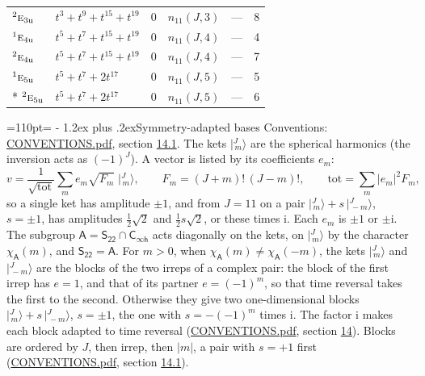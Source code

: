 \documentclass[10pt,a4paper]{article}
\makeatletter
\renewcommand\section{\@startsection{section}{1}{\z@}{-3ex plus -1ex minus -.2ex}%
  {1.2ex plus .2ex}{\normalfont\large\sffamily\bfseries\color{parttitle}}}
\newcommand{\needspace}[1]{\par\penalty-100\begingroup\dimen0=#1\relax\dimen2=\pagegoal
  \advance\dimen2-\pagetotal\ifdim\dimen0>\dimen2\relax\ifdim\dimen2>0pt\vfil\break\fi\fi
  \endgroup}
\numberwithin{equation}{section}
\newcommand{\grp}[1]{\mathsf{#1}}
\newcommand{\irr}[1]{\text{\normalfont\scshape #1}}
\newcommand{\conjpair}[1]{{}^{#1}}
\newcommand{\ptag}[1]{\mathrm{#1}}
\newcommand{\iunit}{\mathrm{i}}
\newcommand{\chiA}{\chi_{\grp{A}}}
\newcommand{\jm}[2]{\bigl\lvert{}^{#1}_{\,#2}\bigr\rangle}
\makeatother
\begin{document}
{\begin{longtable}{@{}llllll@{}}
$\conjpair{2}\irr{e}_{3\ptag{u}}$ & $t^{3} + t^{9} + t^{15} + t^{19}$ & $0$ & $n_{11}(J,3)$ & --- & 8\\
$\conjpair{1}\irr{e}_{4\ptag{u}}$ & $t^{5} + t^{7} + t^{15} + t^{19}$ & $0$ & $n_{11}(J,4)$ & --- & 4\\
$\conjpair{2}\irr{e}_{4\ptag{u}}$ & $t^{5} + t^{7} + t^{15} + t^{19}$ & $0$ & $n_{11}(J,4)$ & --- & 7\\
$\conjpair{1}\irr{e}_{5\ptag{u}}$ & $t^{5} + t^{7} + 2t^{17}$ & $0$ & $n_{11}(J,5)$ & --- & 5\\*
$\conjpair{2}\irr{e}_{5\ptag{u}}$ & $t^{5} + t^{7} + 2t^{17}$ & $0$ & $n_{11}(J,5)$ & --- & 6\\
\bottomrule\end{longtable}}
\needspace{110pt}
\section{Symmetry-adapted bases}\label{s:bases}
Conventions: \href{../../CONVENTIONS.pdf}{CONVENTIONS.pdf}, section \href{../../CONVENTIONS.pdf\#conv.14.1}{14.1}.
\leavevmode\label{n:index.m}\label{n:vector.ket}The kets $\jm{J}{m}$ are the spherical harmonics (the inversion acts as $(-1)^J$). \label{n:index.ketcoefficient}\label{n:vector.basis.symmetry}\label{n:index.ketweight}\label{n:index.total}A vector is listed by its coefficients $e_m$:
\begin{equation}\label{e:ket}v = \frac{1}{\sqrt{\mathrm{tot}}}\sum_m e_m\sqrt{F_m}\;\jm{J}{m},\qquad F_m = (J+m)!\,(J-m)!,\qquad \mathrm{tot} = \sum_m |e_m|^2F_m,\end{equation}
\leavevmode\label{n:index.pair.sign}so a single ket has amplitude $\pm1$, and from $J = 11$ on a pair $\jm{J}{m} + s\,\jm{J}{-m}$, $s = \pm1$, has amplitudes $\tfrac{1}{2}\sqrt{2}$ and $\tfrac{1}{2}s\sqrt{2}$, or these times $\iunit$. Each $e_m$ is $\pm1$ or $\pm\iunit$.
\leavevmode\label{n:group.A}\label{n:function.character.abelian}The subgroup $\grp{A} = \grp{S_{22}}\cap\grp{C_{\infty h}}$ acts diagonally on the kets, on $\jm{J}{m}$ by the character $\chiA(m)$, and $\grp{S_{22}} = \grp{A}$. For $m > 0$, when $\chiA(m) \ne \chiA(-m)$, the kets $\jm{J}{m}$ and $\jm{J}{-m}$ are the blocks of the two irreps of a complex pair: the block of the first irrep has $e = 1$, and that of its partner $e = (-1)^m$, so that time reversal takes the first to the second. Otherwise they give two one-dimensional blocks $\jm{J}{m} + s\,\jm{J}{-m}$, $s = \pm1$, the one with $s = -(-1)^m$ times $\iunit$. The factor $\iunit$ makes each block adapted to time reversal (\href{../../CONVENTIONS.pdf}{CONVENTIONS.pdf}, section \href{../../CONVENTIONS.pdf\#conv.14}{14}). Blocks are ordered by $J$, then irrep, then $|m|$, a pair with $s = +1$ first (\href{../../CONVENTIONS.pdf}{CONVENTIONS.pdf}, section \href{../../CONVENTIONS.pdf\#conv.14.1}{14.1}).
\end{document}
